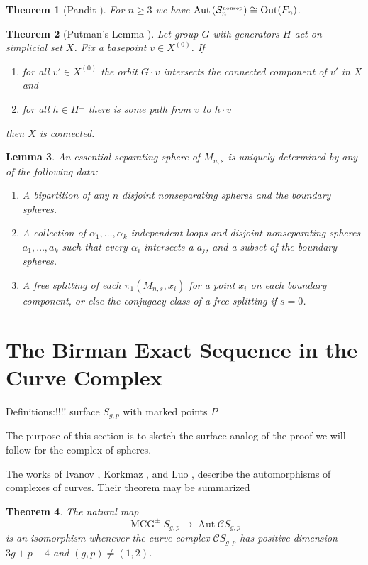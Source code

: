 \documentclass[11pt]{article}
\newcommand{\Aut}[1]{\ensuremath{ \aaut \left (#1 \right ) }}
\newcommand{\outn}{{\ensuremath{ \oout(F_n)}} }
\newcommand{\nosep}{{\ensuremath{ \mathcal S^{\mbox{\tiny{nonsep}}}_n }}}
\DeclareMathOperator{\oout}{Out}
\DeclareMathOperator{\mcg}{MCG}
\DeclareMathOperator{\aaut}{Aut}
\newtheorem{theorem}{Theorem}
\newtheorem{lemma}[theorem]{Lemma}
\theoremstyle{remark}
\theoremstyle{definition}
\begin{document}
\begin{theorem}[Pandit \cite{pandit}]
  For $n \geq 3$ we have $\Aut{\nosep} \cong \outn$.
\end{theorem}

\begin{theorem}[Putman's Lemma \cite{putman}]
  \label{putmanlemma}
  Let group $G$ with generators $H$ act on simplicial set $X$. Fix a basepoint $v \in X^{(0)}$.
  If
  \begin{enumerate}
  \item for all $v' \in X^{(0)}$ the orbit $G\cdot v$ intersects the connected component of $v'$ in $X$ and
  \item for all $h \in H^{\pm}$ there is some path from $v$ to $h\cdot v$
  \end{enumerate}
  then $X$ is connected.\\
\end{theorem}


\begin{lemma}
  An essential separating sphere of $M_{n,s}$ is uniquely determined by
  any of the following data:
  \begin{enumerate}
    \item A bipartition of any $n$ disjoint nonseparating spheres
    and the boundary spheres.
    \item A collection of $\alpha_1,\ldots, \alpha_k$
    independent loops
    and disjoint nonseparating spheres $a_1,\ldots,a_k$
    such that every $\alpha_i$ intersects a $a_j$, and a subset of the boundary spheres.
    \item
    A free splitting of each
    $\pi_1(M_{n,s},x_i)$ for a point $x_i$ on each boundary
    component, or else the conjugacy class
    of a free splitting if $s=0$.
  \end{enumerate}
  \label{lemma:sepspecify}
\end{lemma}


\section{
The Birman Exact Sequence in the Curve Complex
}

Definitions:!!!!
surface $S_{g,p}$ with marked points $P$



The purpose of this section is to sketch the surface analog of the proof we will follow for the complex of spheres.

The works of
Ivanov \cite{MR1460387},
Korkmaz \cite{MR1696431},
and
Luo \cite{MR1722024},
describe the automorphisms of complexes of curves.
Their theorem may be summarized
\begin{theorem}
  The natural map
  $$
  \mcg^\pm S_{g,p} \to  \aaut \mathcal C S_{g,p}
  $$
  is an isomorphism whenever the curve complex
  $\mathcal C S_{g,p}$
  has positive dimension $3g+p-4$ and $(g,p) \neq (1,2)$.
  \label{thm:curvecomplex}
\end{theorem}
\end{document}
